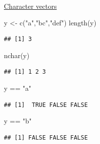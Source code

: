 \documentclass[
  10pt,
  ignorenonframetext,
]{beamer}
\newenvironment{Shaded}{\begin{snugshade}}{\end{snugshade}}
\newcommand{\KeywordTok}[1]{\textcolor[rgb]{0.94,0.87,0.69}{#1}}
\newcommand{\NormalTok}[1]{\textcolor[rgb]{0.80,0.80,0.80}{#1}}
\newcommand{\OperatorTok}[1]{\textcolor[rgb]{0.94,0.94,0.82}{#1}}
\newcommand{\StringTok}[1]{\textcolor[rgb]{0.80,0.58,0.58}{#1}}
\begin{document}
\begin{frame}[fragile]{\href{https://www.stat.berkeley.edu/~nolan/stat133/Fall05/lectures/DataTypes4.pdf}{Character
vectors}}
\protect\hypertarget{character-vectors}{}

\begin{Shaded}
\begin{Highlighting}[]
\NormalTok{y <-}\StringTok{ }\KeywordTok{c}\NormalTok{(}\StringTok{"a"}\NormalTok{,}\StringTok{"bc"}\NormalTok{,}\StringTok{"def"}\NormalTok{)}
\KeywordTok{length}\NormalTok{(y)}
\end{Highlighting}
\end{Shaded}

\begin{verbatim}
## [1] 3
\end{verbatim}

\begin{Shaded}
\begin{Highlighting}[]
\KeywordTok{nchar}\NormalTok{(y)}
\end{Highlighting}
\end{Shaded}

\begin{verbatim}
## [1] 1 2 3
\end{verbatim}

\begin{Shaded}
\begin{Highlighting}[]
\NormalTok{y }\OperatorTok{==}\StringTok{ "a"}
\end{Highlighting}
\end{Shaded}

\begin{verbatim}
## [1]  TRUE FALSE FALSE
\end{verbatim}

\begin{Shaded}
\begin{Highlighting}[]
\NormalTok{y }\OperatorTok{==}\StringTok{ "b"}
\end{Highlighting}
\end{Shaded}

\begin{verbatim}
## [1] FALSE FALSE FALSE
\end{verbatim}

\end{frame}
\end{document}
